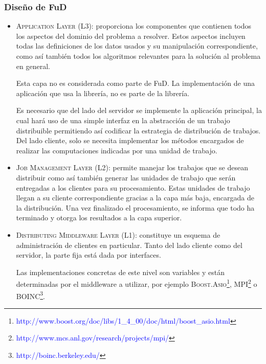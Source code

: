 \documentclass[12pt,a4paper,spanish]{article}
\begin{document}
		\subsubsection{Diseño de FuD}	
		\begin{itemize}
			\item \textsc{Application Layer (L3):} proporciona los componentes que contienen todos los aspectos del dominio del problema a resolver. Estos 														aspectos incluyen todas las definiciones de los datos usados y su manipulación correspondiente, como 														así también todos los algoritmos relevantes para la solución al problema en general. 
													\par Esta capa no es considerada como parte de FuD. La implementación de una aplicación que usa la 														librería, no es parte de la librería.
													\par Es necesario que del lado del servidor se implemente la aplicación principal, la cual hará uso de 														una simple interfaz en la abstracción de un trabajo distribuible permitiendo así codificar la 														estrategia de distribución de trabajos. Del lado cliente, solo se necesita implementar los métodos 														encargados de realizar las computaciones indicadas por una unidad de trabajo.
			\item \textsc{Job Management Layer (L2):} permite manejar los trabajos que se desean distribuir como así también generar las unidades de 														trabajo que serán entregadas a los clientes para su procesamiento. Estas unidades de trabajo llegan
													a su cliente correspondiente gracias a la capa más baja, encargada de la distribución. Una vez 														finalizado el procesamiento, se informa que todo ha terminado y otorga los resultados a la capa 													superior.
			\item \textsc{Distributing Middleware Layer (L1):} constituye un esquema de administración de clientes en particular. Tanto del lado cliente 																	como del servidor, la parte fija está dada por interfaces.	
																\par Las implementaciones concretas de este nivel son variables y están determinadas por
																el middleware a utilizar, por ejemplo \textsc{Boost.Asio}\footnote{\textcolor{blue}{http://www.boost.org/doc/libs/1\_4\_00/doc/html/boost\_asio.html}}, \textsc{MPI}\footnote{\textcolor{blue}{http://www.mcs.anl.gov/research/projects/mpi/}} o 
																\textsc{BOINC}\footnote{\textcolor{blue}{http://boinc.berkeley.edu/}}. 
		\end{itemize}	
\end{document}
